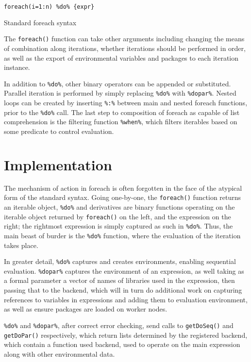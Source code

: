 \documentclass[a4paper,10pt]{article}
\begin{document}
\begin{listing}
\begin{verbatim}
foreach(i=1:n) %do% {expr}
\end{verbatim}
\caption{Standard foreach syntax}\label{src:syntax}
\end{listing}

The \texttt{foreach()} function can take other arguments including
changing the means of combination along iterations, whether iterations
should be performed in order, as well as the export of environmental
variables and packages to each iteration instance.

In addition to \texttt{\%do\%}, other binary operators can be appended
or substituted. Parallel iteration is performed by simply replacing
\texttt{\%do\%} with \texttt{\%dopar\%}. Nested loops can be created
by inserting \texttt{\%:\%} between main and nested foreach functions,
prior to the \texttt{\%do\%} call\cite{weston19:_nestin_loops}. The
last step to composition of foreach as capable of list comprehension
is the filtering function \texttt{\%when\%}, which filters iterables
based on some predicate to control evaluation.


\section{Implementation}
\label{sec:implementation}

The mechanism of action in foreach is often forgotten in the face of
the atypical form of the standard syntax. Going one-by-one, the
\texttt{foreach()} function returns an iterable object,
\texttt{\%do\%} and derivatives are binary functions operating on the
iterable object returned by \texttt{foreach()} on the left, and the
expression on the right; the rightmost expression is simply captured
as such in \texttt{\%do\%}. Thus, the main beast of burder is the
\texttt{\%do\%} function, where the evaluation of the iteration takes
place.

In greater detail, \texttt{\%do\%} captures and creates environments, enabling
sequential evaluation. \texttt{\%dopar\%} captures the environment of an
expression, as well taking as a formal parameter a vector of names of libraries
used in the expression, then passing that to the backend, which will in turn do
additional work on capturing references to variables in expressions and adding
them to evaluation environment, as well as ensure packages are loaded on worker
nodes.

\texttt{\%do\%} and \texttt{\%dopar\%}, after correct error checking,
send calls to \texttt{getDoSeq()} and \texttt{getDoPar()}
respectively, which return lists determined by the registered backend,
which contain a function used backend, used to operate on the main
expression along with other environmental data.
\end{document}
